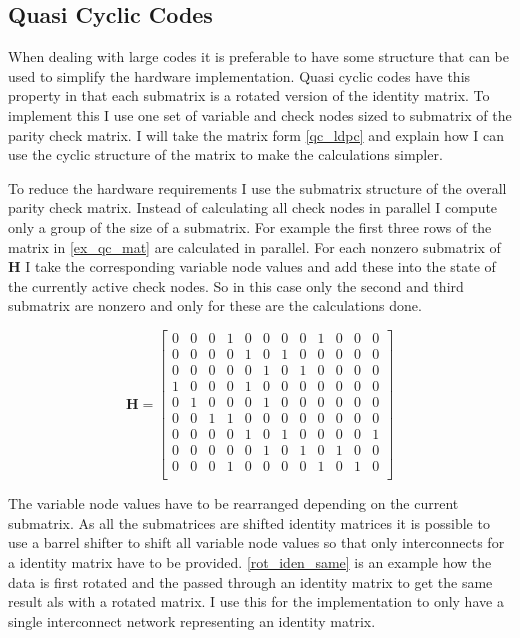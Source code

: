 \subsection{Quasi Cyclic Codes}
When dealing with large codes it is preferable to have some structure that can be used to simplify the hardware implementation. Quasi cyclic codes have this property in that each submatrix is a rotated  version of the identity matrix. To implement this I use one set of variable and check nodes sized to submatrix of the parity check matrix. I will take the matrix form \cref{qc_ldpc} and explain how I can use the cyclic structure of the matrix to make the calculations simpler.

To reduce the hardware requirements I use the submatrix structure of the overall parity check matrix. Instead of calculating all check nodes in parallel I compute only a group of the size of a submatrix. For example the first three rows of the matrix in \cref{ex_qc_mat} are calculated in parallel. For each nonzero submatrix of $\bm{H}$ I take the corresponding variable node values and add these into the state of the currently active check nodes. So in this case only the second and third submatrix are nonzero and only for these are the calculations done. 

\begin{equation}
	\bm{H} = \left[\begin{matrix}
		0 & 0 & 0 & 1 & 0 & 0 & 0 & 0 & 1 & 0 & 0 & 0 \\
		0 & 0 & 0 & 0 & 1 & 0 & 1 & 0 & 0 & 0 & 0 & 0 \\
		0 & 0 & 0 & 0 & 0 & 1 & 0 & 1 & 0 & 0 & 0 & 0 \\
		1 & 0 & 0 & 0 & 1 & 0 & 0 & 0 & 0 & 0 & 0 & 0 \\
		0 & 1 & 0 & 0 & 0 & 1 & 0 & 0 & 0 & 0 & 0 & 0 \\
		0 & 0 & 1 & 1 & 0 & 0 & 0 & 0 & 0 & 0 & 0 & 0 \\
		0 & 0 & 0 & 0 & 1 & 0 & 1 & 0 & 0 & 0 & 0 & 1 \\
		0 & 0 & 0 & 0 & 0 & 1 & 0 & 1 & 0 & 1 & 0 & 0 \\
		0 & 0 & 0 & 1 & 0 & 0 & 0 & 0 & 1 & 0 & 1 & 0 \\
    \end{matrix}\right] \label{ex_qc_mat}
\end{equation}

The variable node values have to be rearranged depending on the current submatrix. As all the submatrices are shifted identity matrices it is possible to use a barrel shifter to shift all variable node values so that only interconnects for a identity matrix have to be provided. \cref{rot_iden_same} is an example how the data is first rotated and the passed through an identity matrix to get the same result als with a rotated matrix. I use this for the implementation to only have a single interconnect network representing an identity matrix.

